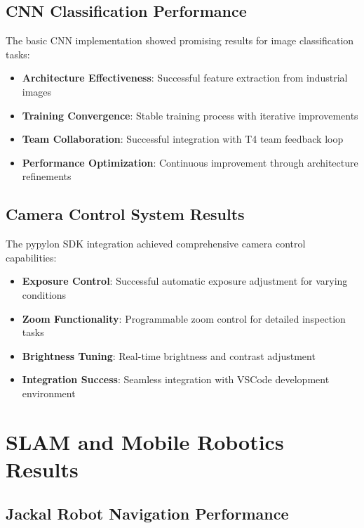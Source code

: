 \documentclass{book}
\begin{document}
\subsection{CNN Classification Performance}

\par\noindent The basic CNN implementation showed promising results for image classification tasks:

\begin{itemize}
\item \textbf{Architecture Effectiveness}: Successful feature extraction from industrial images
\item \textbf{Training Convergence}: Stable training process with iterative improvements
\item \textbf{Team Collaboration}: Successful integration with T4 team feedback loop
\item \textbf{Performance Optimization}: Continuous improvement through architecture refinements
\end{itemize}

\subsection{Camera Control System Results}

\par\noindent The pypylon SDK integration achieved comprehensive camera control capabilities:

\begin{itemize}
\item \textbf{Exposure Control}: Successful automatic exposure adjustment for varying conditions
\item \textbf{Zoom Functionality}: Programmable zoom control for detailed inspection tasks
\item \textbf{Brightness Tuning}: Real-time brightness and contrast adjustment
\item \textbf{Integration Success}: Seamless integration with VSCode development environment
\end{itemize}

\section{SLAM and Mobile Robotics Results}

\subsection{Jackal Robot Navigation Performance}
\end{document}
